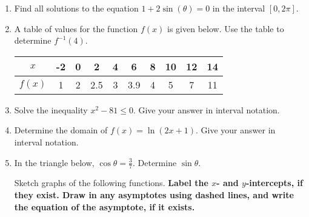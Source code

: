 \documentclass[12pt]{article}
\begin{document}
\begin{enumerate}
\item Find all solutions to the equation $1+2\sin (\theta) = 0$ in the interval $[0, 2 \pi].$\\


\quad \hfill \underline{\hspace{2in}}
\vfill


\item A table of values for the function $f(x)$ is given below. Use the table to determine $f^{-1}(4).$

\begin{tabular}{|c||c|c|c|c|c|c|c|c|c|}
$x$&-2&0&2&4&6&8&10&12&14\\
\hline
$f(x)$&1&2&2.5&3&3.9&4&5&7&11\\
\end{tabular}

\quad \hfill \underline{\hspace{2in}}
\vspace{.2in}

\item Solve the inequality $x^2-81\leq 0.$ Give your answer in interval notation.\\
\quad

\quad \hfill \underline{\hspace{2in}}
\vfill


\item Determine the domain of $f(x)=\ln(2x+1).$ Give your answer in interval notation.\\
\quad

\quad \hfill \underline{\hspace{2in}}
\vfill


 \item In the triangle below, $\cos \theta = \frac{3}{7}.$ Determine $\sin \theta.$ \\ 
 
 \hfill \underline{\hspace{2in}}
\newpage
Sketch graphs of the following functions. \textbf{Label the $x$- and $y$-intercepts, if they exist. Draw in any asymptotes using dashed lines, and write the equation of the asymptote, if it exists.}
\begin{multicols}{2}{
      \vspace*{-0.45in}

}
\end{multicols}
\end{enumerate}
\end{document}
